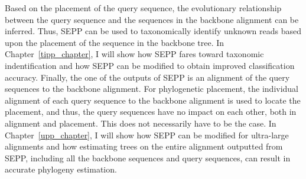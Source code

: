 Based on the placement of the query sequence, the evolutionary relationship between the query sequence and the sequences in the backbone alignment can be inferred.  Thus, SEPP can be used to taxonomically identify unknown reads based upon the placement of the sequence in the backbone tree.  In Chapter~\ref{tipp_chapter}, I will show how SEPP fares toward taxonomic indentification and how SEPP can be modified to obtain improved classification accuracy.  Finally, the one of the outputs of SEPP is an alignment of the query sequences to the backbone alignment.  For phylogenetic placement, the individual alignment of each query sequence to the backbone alignment is used to locate the placement, and thus, the query sequences have no impact on each other, both in alignment and placement.  This does not necessarily have to be the case.  In Chapter~\ref{upp_chapter}, I will show how SEPP can be modified for ultra-large alignments and how estimating trees on the entire alignment outputted from SEPP, including all the backbone sequences and query sequences, can result in accurate phylogeny estimation.
